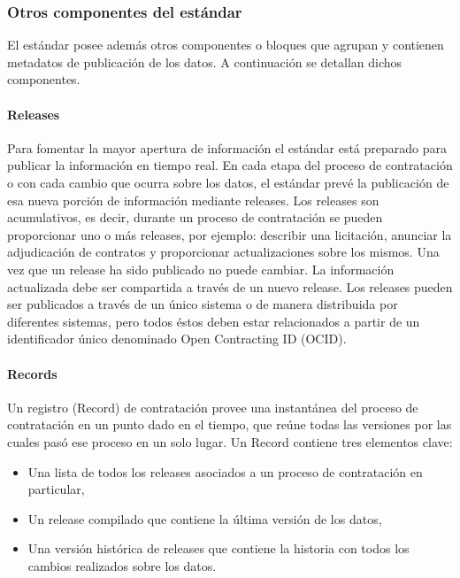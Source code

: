 \subsubsection{Otros componentes del estándar}

El estándar posee además otros componentes o bloques que agrupan y contienen metadatos de publicación de los datos.  A continuación se detallan dichos componentes.

\paragraph{Releases}
Para fomentar la mayor apertura de información el estándar está preparado para publicar la información en tiempo real. En cada etapa del proceso de contratación o con cada cambio que ocurra sobre los datos, el estándar prevé la publicación de esa nueva porción de información mediante releases.
Los releases son acumulativos, es decir, durante un proceso de contratación se pueden proporcionar uno o más releases, por ejemplo: describir una licitación, anunciar la adjudicación de contratos y proporcionar actualizaciones sobre los mismos.
Una vez que un release ha sido publicado no puede cambiar. La información actualizada debe ser compartida a través de un nuevo release.
Los releases pueden ser publicados a través de un único sistema o de manera distribuida por diferentes sistemas, pero todos éstos deben estar relacionados a partir de un identificador único denominado Open Contracting ID (OCID).

\paragraph{Records}

Un registro (Record) de contratación provee una instantánea del proceso de contratación en un punto dado en el tiempo, que reúne todas las versiones por las cuales pasó ese proceso en un solo lugar.
Un Record contiene tres elementos clave: 
\begin{itemize}
    \item Una lista de todos los releases asociados a un proceso de contratación en particular, 
    \item Un release compilado que contiene la última versión de los datos,
    \item Una versión histórica de releases que contiene la historia con todos los cambios realizados sobre los datos.
 

    
\end{itemize}

